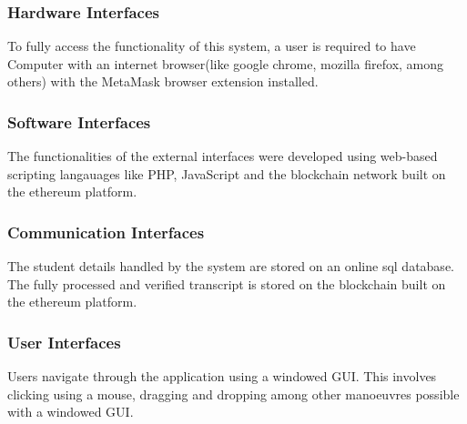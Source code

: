 \subsubsection{Hardware Interfaces}
To fully access the functionality of this system, a user is required to have Computer with an internet browser(like google chrome, mozilla firefox, among others) with the MetaMask browser extension installed. 

\subsubsection{Software Interfaces}
The functionalities of the external interfaces were developed using web-based scripting langauages like PHP, JavaScript and the blockchain network built on the ethereum platform.

\subsubsection{Communication Interfaces}
The student details handled by the system are stored on an online sql database. The fully processed and verified transcript is stored on the blockchain built on the ethereum platform.

\subsubsection{User Interfaces}
Users navigate through the application using a windowed GUI. This involves clicking using a mouse, dragging and dropping among other manoeuvres possible with a windowed GUI.